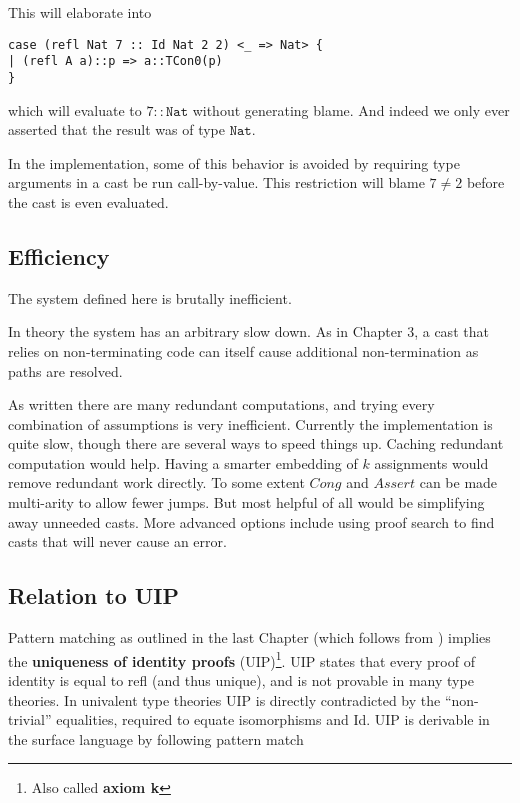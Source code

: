 This will elaborate into 

\begin{lstlisting}[basicstyle={\ttfamily\small}]
case (refl Nat 7 :: Id Nat 2 2) <_ => Nat> {
| (refl A a)::p => a::TCon0(p)
}
\end{lstlisting}

which will evaluate to $7::\mathtt{Nat}$ without generating blame.
And indeed we only ever asserted that the result was of type $\mathtt{Nat}$.

In the implementation, some of this behavior is avoided by requiring
type arguments in a cast be run call-by-value. This restriction will
blame $7\neq2$ before the cast is even evaluated.

\subsection{Efficiency}

The system defined here is brutally inefficient. 

In theory the system has an arbitrary slow down. As in Chapter 3,
a cast that relies on non-terminating code can itself cause additional
non-termination as paths are resolved.

As written there are many redundant computations, and trying every
combination of assumptions is very inefficient. Currently the implementation
is quite slow, though there are several ways to speed things up. Caching
redundant computation would help. Having a smarter embedding of $k$
assignments would remove redundant work directly. To some extent $Cong$
and $Assert$ can be made multi-arity to allow fewer jumps. But most
helpful of all would be simplifying away unneeded casts. More advanced
options include using proof search to find casts that will never cause
an error.




\subsection{Relation to UIP}

Pattern matching as outlined in the last Chapter (which follows from
\cite{coquand1992pattern}) implies the \textbf{uniqueness of identity
proofs} (UIP)\footnote{Also called \textbf{axiom k}}. UIP states
that every proof of identity is equal to refl (and thus unique), and
is not provable in many type theories. In univalent type theories
UIP is directly contradicted by the ``non-trivial'' equalities,
required to equate isomorphisms and Id. UIP is derivable in the surface
language by following pattern match 

